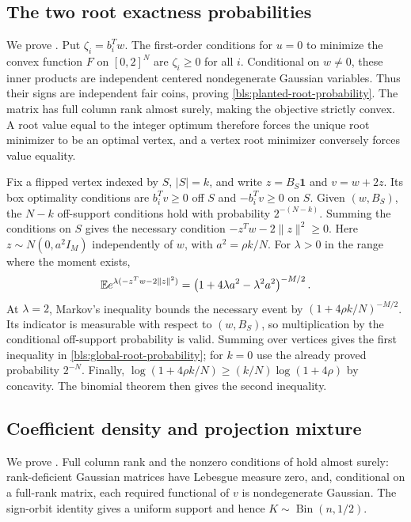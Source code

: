 \subsection{The two root exactness probabilities}
\label{app:bls-root-exactness-proof}

We prove .  Put $\zeta_i=b_i^Tw$.
The first-order conditions for $u=0$ to minimize the convex function
$F$ on $[0,2]^N$ are $\zeta_i\ge0$ for all $i$.
Conditional on $w\ne0$, these inner products are independent centered
nondegenerate Gaussian variables.  Thus their signs are independent fair
coins, proving \eqref{bls:planted-root-probability}.  The matrix has full
column rank almost surely, making the objective strictly convex.  A root
value equal to the integer optimum therefore forces the unique root
minimizer to be an optimal vertex, and a vertex root minimizer conversely
forces value equality.

Fix a flipped vertex indexed by $S$, $|S|=k$, and write
$z=B_S\mathbf1$ and $v=w+2z$.  Its box optimality conditions are
$b_i^Tv\ge0$ off $S$ and $-b_i^Tv\ge0$ on $S$.
Given $(w,B_S)$, the $N-k$ off-support conditions hold with probability
$2^{-(N-k)}$.  Summing the conditions on $S$ gives the necessary condition
$-z^Tw-2\|z\|^2\ge0$.  Here $z\sim N(0,a^2I_M)$ independently of
$w$, with $a^2=\rho k/N$.  For $\lambda>0$ in the range where the moment
exists,
\[
 \mathbb{E} e^{\lambda(-z^Tw-2\|z\|^2)}
 =\left(1+4\lambda a^2-\lambda^2a^2\right)^{-M/2}.
\]
At $\lambda=2$, Markov's inequality bounds the necessary event by
$(1+4\rho k/N)^{-M/2}$.  Its indicator is measurable with respect to
$(w,B_S)$, so multiplication by the conditional off-support probability
is valid.  Summing over vertices gives the first inequality in
\eqref{bls:global-root-probability}; for $k=0$ use the already proved
probability $2^{-N}$.
Finally,
$\log(1+4\rho k/N)\ge(k/N)\log(1+4\rho)$ by concavity.  The binomial
theorem then gives the second inequality.

\subsection{Coefficient density and projection mixture}
\label{app:bls-nnls-proofs}

We prove .  Full column rank and the nonzero
conditions of  hold almost surely: rank-deficient
Gaussian matrices have Lebesgue measure zero, and, conditional on a
full-rank matrix, each required functional of $v$ is nondegenerate
Gaussian.  The sign-orbit identity gives a uniform support and hence
$K\sim\operatorname{Bin}(n,1/2)$.

